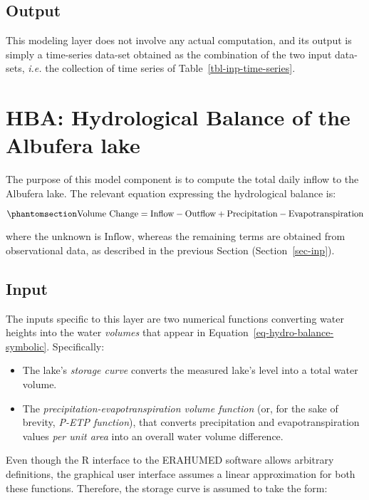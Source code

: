 \documentclass[
  letterpaper,
  DIV=11,
  numbers=noendperiod]{scrreprt}
\providecommand{\tightlist}{%
  \setlength{\itemsep}{0pt}\setlength{\parskip}{0pt}}\usepackage{longtable,booktabs,array}
\begin{document}
\subsection{Output}\label{output}

This modeling layer does not involve any actual computation, and its
output is simply a time-series data-set obtained as the combination of
the two input data-sets, \emph{i.e.} the collection of time series of
Table~\ref{tbl-inp-time-series}.

\section{HBA: Hydrological Balance of the Albufera lake}\label{sec-hba}

The purpose of this model component is to compute the total daily inflow
to the Albufera lake. The relevant equation expressing the hydrological
balance is:

\begin{equation}\phantomsection\label{eq-hydro-balance-symbolic}{
\text{Volume Change} = \text{Inflow} - \text{Outflow} + \text{Precipitation} - \text{Evapotranspiration}
}\end{equation}

where the unknown is \(\text{Inflow}\), whereas the remaining terms are
obtained from observational data, as described in the previous Section
(Section~\ref{sec-inp}).

\subsection{Input}\label{input-1}

The inputs specific to this layer are two numerical functions converting
water heights into the water \emph{volumes} that appear in
Equation~\ref{eq-hydro-balance-symbolic}. Specifically:

\begin{itemize}
\tightlist
\item
  The lake's \emph{storage curve} converts the measured lake's level
  into a total water volume.
\item
  The \emph{precipitation-evapotranspiration volume function} (or, for
  the sake of brevity, \emph{P-ETP function}), that converts
  precipitation and evapotranspiration values \emph{per unit area} into
  an overall water volume difference.
\end{itemize}

Even though the R interface to the ERAHUMED software allows arbitrary
definitions, the graphical user interface assumes a linear approximation
for both these functions. Therefore, the storage curve is assumed to
take the form:
\end{document}
